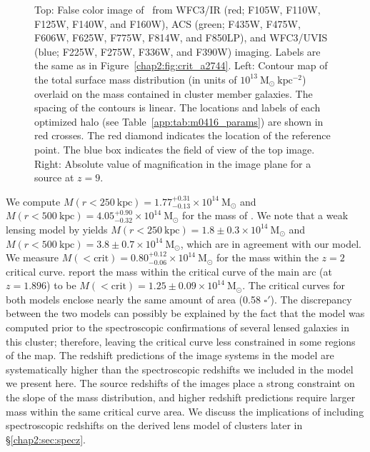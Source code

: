 \begin{figure}[h]
\caption[\MACSzerofour\ image constraints and critical curves]{Top: False color image of \MACSzerofour\ from WFC3/IR (red; F105W, F110W, F125W, F140W, and F160W), ACS (green; F435W, F475W, F606W, F625W, F775W, F814W, and F850LP), and WFC3/UVIS (blue; F225W, F275W, F336W, and F390W) imaging. Labels are the same as in Figure~\ref{chap2:fig:crit_a2744}. Left: Contour map of the total surface mass distribution (in units of $10^{13}\ \mathrm{M_\odot \ kpc^{-2}}$) overlaid on the mass contained in cluster member galaxies. The spacing of the contours is linear. The locations and labels of each optimized halo (see Table~\ref{app:tab:m0416_params}) are shown in red crosses. The red diamond indicates the location of the reference point. The blue box indicates the field of view of the top image. Right: Absolute value of magnification in the image plane for a source at $z=9$.}
\label{chap2:fig:crit_m0416}
\end{figure}

We compute $M(r<250\ \mathrm{kpc})=1.77^{+0.31}_{-0.13}\times10^{14}\ \mathrm{M_\odot}$ and $M(r<500\ \mathrm{kpc})=4.05^{+0.90}_{-0.32}\times10^{14}\ \mathrm{M_\odot}$ for the mass of \MACSzerofour. We note that a weak lensing model by \citet{Gruen:2014lr} yields $M(r<250\ \mathrm{kpc})=1.8\pm0.3\times10^{14}\ \mathrm{M_\odot}$ and $M(r<500\ \mathrm{kpc})=3.8\pm0.7\times10^{14}\ \mathrm{M_\odot}$, which are in agreement with our model. We measure $M(<\mathrm{crit})=0.80^{+0.12}_{-0.06}\times10^{14}\ \mathrm{M_\odot}$ for the mass within the $z=2$ critical curve. \citet{Zitrin:2013lr} report the mass within the critical curve of the main arc (at $z=1.896$) to be $M(<\mathrm{crit})=1.25\pm0.09\times10^{14}\ \mathrm{M_\odot}$. The critical curves for both models enclose nearly the same amount of area (0.58 $\square'$). The discrepancy between the two models can possibly be explained by the fact that the \citet{Zitrin:2013lr} model was computed prior to the spectroscopic confirmations of several lensed galaxies in this cluster; therefore, leaving the critical curve less constrained in some regions of the map. The redshift predictions of the image systems in the \citet{Zitrin:2013lr} model are systematically higher than the spectroscopic redshifts we included in the model we present here. The source redshifts of the images place a strong constraint on the slope of the mass distribution, and higher redshift predictions require larger mass within the same critical curve area. We discuss the implications of including spectroscopic redshifts on the derived lens model of clusters later in \S \ref{chap2:sec:specz}.

